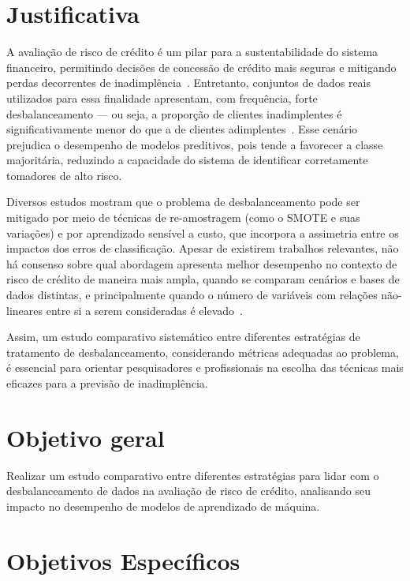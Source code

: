 \section{Justificativa}\label{sec:justificativa}

A avaliação de risco de crédito é um pilar para a sustentabilidade do sistema financeiro, permitindo decisões de concessão de crédito mais seguras e mitigando perdas decorrentes de inadimplência~\cite{Shi2022}. Entretanto, conjuntos de dados reais utilizados para essa finalidade apresentam, com frequência, forte desbalanceamento — ou seja, a proporção de clientes inadimplentes é significativamente menor do que a de clientes adimplentes~\cite{Namvar2018}. Esse cenário prejudica o desempenho de modelos preditivos, pois tende a favorecer a classe majoritária, reduzindo a capacidade do sistema de identificar corretamente tomadores de alto risco.

Diversos estudos mostram que o problema de desbalanceamento pode ser mitigado por meio de técnicas de re-amostragem (como o SMOTE e suas variações) e por aprendizado sensível a custo, que incorpora a assimetria entre os impactos dos erros de classificação. Apesar de existirem trabalhos relevantes, não há consenso sobre qual abordagem apresenta melhor desempenho no contexto de risco de crédito de maneira mais ampla, quando se comparam cenários e bases de dados distintas, e principalmente quando o número de variáveis com relações não-lineares entre si a serem consideradas é elevado~\cite{Wei2025}.

Assim, um estudo comparativo sistemático entre diferentes estratégias de tratamento de desbalanceamento, considerando métricas adequadas ao problema, é essencial para orientar pesquisadores e profissionais na escolha das técnicas mais eficazes para a previsão de inadimplência.

\section{Objetivo geral}\label{sec:objetivo-geral}

Realizar um estudo comparativo entre diferentes estratégias para lidar com o desbalanceamento de dados na avaliação de risco de crédito, analisando seu impacto no desempenho de modelos de aprendizado de máquina.

\section{Objetivos Específicos}\label{sec:objetivos-especificos}

